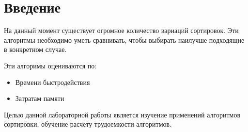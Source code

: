 

\chapter*{Введение}

На данный момент существует огромное количество вариаций сортировок.
Эти алгоритмы необходимо уметь сравнивать, чтобы выбирать наилучше подходящие в конкретном случае. 

Эти алгоримы оцениваются по:

\begin{itemize}
	\item Времени быстродействия
	\item Затратам памяти
\end{itemize}

Целью данной лабораторной работы является изучение применений алгоритмов сортировки, обучение расчету трудоемкости алгоритмов.


